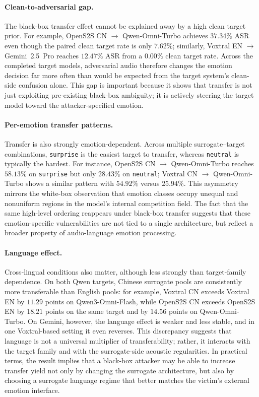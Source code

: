 \paragraph{Clean-to-adversarial gap.}
The black-box transfer effect cannot be explained away by a high clean target prior.
For example, OpenS2S CN $\rightarrow$ Qwen-Omni-Turbo achieves $37.34\%$ ASR even though the paired clean target rate is only $7.62\%$; similarly, Voxtral EN $\rightarrow$ Gemini~2.5~Pro reaches $12.47\%$ ASR from a $0.00\%$ clean target rate.
Across the completed target models, adversarial audio therefore changes the emotion decision far more often than would be expected from the target system's clean-side confusion alone.
This gap is important because it shows that transfer is not just exploiting pre-existing black-box ambiguity; it is actively steering the target model toward the attacker-specified emotion.

\paragraph{Per-emotion transfer patterns.}
Transfer is also strongly emotion-dependent.
Across multiple surrogate--target combinations, \texttt{surprise} is the easiest target to transfer, whereas \texttt{neutral} is typically the hardest.
For instance, OpenS2S CN $\rightarrow$ Qwen-Omni-Turbo reaches $58.13\%$ on \texttt{surprise} but only $28.43\%$ on \texttt{neutral}; Voxtral CN $\rightarrow$ Qwen-Omni-Turbo shows a similar pattern with $54.92\%$ versus $25.94\%$.
This asymmetry mirrors the white-box observation that emotion classes occupy unequal and nonuniform regions in the model's internal competition field.
The fact that the same high-level ordering reappears under black-box transfer suggests that these emotion-specific vulnerabilities are not tied to a single architecture, but reflect a broader property of audio-language emotion processing.

\paragraph{Language effect.}
Cross-lingual conditions also matter, although less strongly than target-family dependence.
On both Qwen targets, Chinese surrogate pools are consistently more transferable than English pools: for example, Voxtral CN exceeds Voxtral EN by $11.29$ points on Qwen3-Omni-Flash, while OpenS2S CN exceeds OpenS2S EN by $18.21$ points on the same target and by $14.56$ points on Qwen-Omni-Turbo.
On Gemini, however, the language effect is weaker and less stable, and in one Voxtral-based setting it even reverses.
This discrepancy suggests that language is not a universal multiplier of transferability; rather, it interacts with the target family and with the surrogate-side acoustic regularities.
In practical terms, the result implies that a black-box attacker may be able to increase transfer yield not only by changing the surrogate architecture, but also by choosing a surrogate language regime that better matches the victim's external emotion interface.

